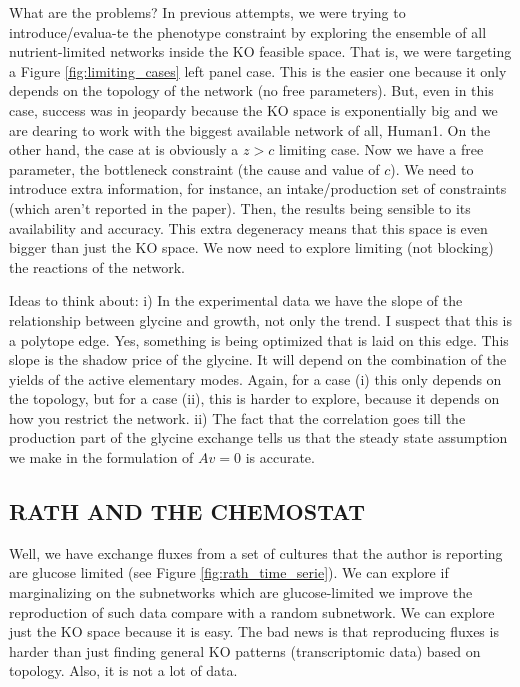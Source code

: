\documentclass[
10pt, %
a4paper, %
oneside, %
headinclude,footinclude, %
BCOR5mm, %
]{scrartcl}
\begin{document}
What are the problems?
In previous attempts, we were trying to introduce/evalua-te the phenotype constraint by exploring the
ensemble of all nutrient-limited networks inside the KO feasible space.
That is, we were targeting a Figure \ref{fig:limiting_cases} left panel case.
This is the easier one because it only depends on the topology of the network (no free parameters).
But, even in this case, success was in jeopardy because the KO space is exponentially big and we are dearing to work
with the biggest available network of all, Human1.
On the other hand, the case at \cite{jainMetaboliteProfilingIdentifies2012} is obviously a $z > c$ limiting case.
Now we have a free parameter, the bottleneck constraint (the cause and value of $c$).
We need to introduce extra information, for instance, an intake/production set of constraints (which aren't reported in the paper).
Then, the results being sensible to its availability and accuracy.
This extra degeneracy means that this space is even bigger than just the KO space.
We now need to explore limiting (not blocking) the reactions of the network.

Ideas to think about:
i) In the experimental data we have the slope of the relationship between glycine and growth, not only the trend.
I suspect that this is a polytope edge. Yes, something is being optimized that is laid on this edge.
This slope is the shadow price of the glycine.
It will depend on the combination of the yields of the active elementary modes.
Again, for a case (i) this only depends on the topology, but for a case (ii), this is harder to explore,
because it depends on how you restrict the network.
ii) The fact that the correlation goes till the production part of the glycine exchange tells us that the
steady state assumption we make in the formulation of $Av = 0$ is accurate.

\subsection{RATH AND THE CHEMOSTAT}

Well, we have exchange fluxes from a set of cultures that the author \cite{rathCharacterisationCellGrowth2017} is reporting are glucose limited (see Figure \ref{fig:rath_time_serie}).
We can explore if marginalizing on the subnetworks which are glucose-limited we improve the reproduction of
such data compare with a random subnetwork.
We can explore just the KO space because it is easy.
The bad news is that reproducing fluxes is harder than just finding general KO patterns (transcriptomic data) based on topology.
Also, it is not a lot of data.
\end{document}
